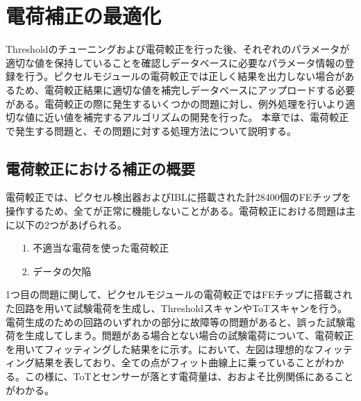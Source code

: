 \chapter{電荷補正の最適化}
\label{sec:chap4}
Thresholdのチューニングおよび電荷較正を行った後、それぞれのパラメータが適切な値を保持していることを確認しデータベースに必要なパラメータ情報の登録を行う。ピクセルモジュールの電荷較正では正しく結果を出力しない場合があるため、電荷較正結果に適切な値を補完しデータベースにアップロードする必要がある。電荷較正の際に発生するいくつかの問題に対し、例外処理を行いより適切な値に近い値を補完するアルゴリズムの開発を行った。
本章では、電荷較正で発生する問題と、その問題に対する処理方法について説明する。

\section{電荷較正における補正の概要}
\label{sec:hoseigaiyou}

電荷較正では、ピクセル検出器およびIBLに搭載された計28400個のFEチップを操作するため、全てが正常に機能しないことがある。電荷較正における問題は主に以下の2つがあげられる。

\begin{itemize}
  \item[1. ] 不適当な電荷を使った電荷較正
  \item[2. ] データの欠陥
\end{itemize}

1つ目の問題に関して、ピクセルモジュールの電荷較正ではFEチップに搭載された回路を用いて試験電荷を生成し、ThresholdスキャンやToTスキャンを行う。電荷生成のための回路のいずれかの部分に故障等の問題があると、誤った試験電荷を生成してしまう。問題がある場合とない場合の試験電荷について、電荷較正を用いてフィッティングした結果をに示す。において、左図は理想的なフィッティング結果を表しており、全ての点がフィット曲線上に乗っていることがわかる。この様に、ToTとセンサーが落とす電荷量は、おおよそ比例関係にあることがわかる。

